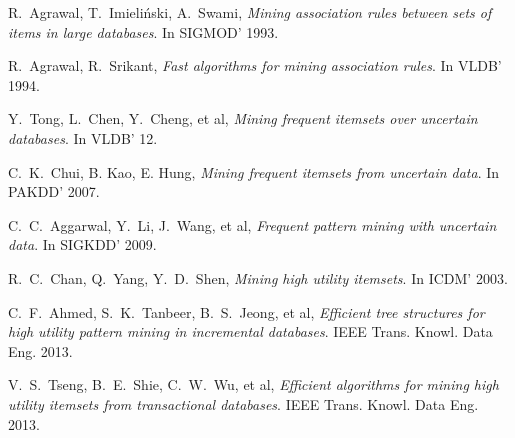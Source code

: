 \documentclass[conference]{IEEEtran}
\begin{document}
%
%
%
\begin{thebibliography}{1}

R.~Agrawal, T.~Imieliński, A.~Swami, \emph{Mining association rules between sets of items in large databases}. In SIGMOD’ 1993.

R.~Agrawal, R.~Srikant, \emph{Fast algorithms for mining association rules}. In VLDB’ 1994.

Y.~Tong, L.~Chen, Y.~Cheng, et al, \emph{Mining frequent itemsets over uncertain databases}. In VLDB’ 12.

C.~K.~Chui, B. Kao, E. Hung, \emph{Mining frequent itemsets from uncertain data}. In PAKDD’ 2007.

C.~C.~Aggarwal, Y.~Li, J.~Wang, et al, \emph{Frequent pattern mining with uncertain data}. In SIGKDD’ 2009.

R.~C.~Chan, Q.~Yang, Y.~D.~Shen, \emph{Mining high utility itemsets}. In ICDM’ 2003.

C.~F.~Ahmed, S.~K.~Tanbeer, B.~S.~Jeong, et al, \emph{Efficient tree structures for high utility pattern mining in incremental databases}. IEEE Trans. Knowl. Data Eng. 2013.

V.~S.~Tseng, B.~E.~Shie, C.~W.~Wu, et al, \emph{Efficient algorithms for mining high utility itemsets from transactional databases}. IEEE Trans. Knowl. Data Eng. 2013.

\end{thebibliography}




\end{document}
